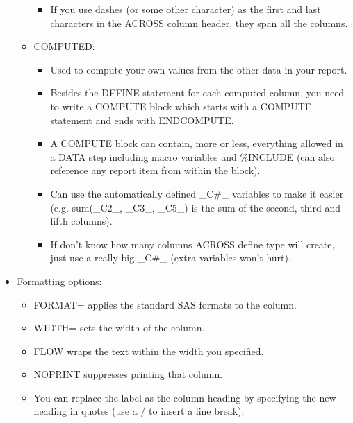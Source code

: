 \documentclass[11pt, oneside]{article}
\begin{document}
\begin{itemize}
\begin{itemize}
\begin{itemize}
		\item If you use dashes (or some other character) as the first and last characters in the ACROSS column header, they span all the columns.
		\end{itemize}
	\item COMPUTED:
		\begin{itemize}
		\item Used to compute your own values from the other data in your report.
		\item Besides the DEFINE statement for each computed column, you need to write a COMPUTE block which starts with a COMPUTE statement and ends with ENDCOMPUTE.
		\item A COMPUTE block can contain, more or less, everything allowed in a DATA step including macro variables and \%INCLUDE (can also reference any report item from within the block). 
		\item Can use the automatically defined \_C\#\_ variables to make it easier (e.g. sum(\_C2\_, \_C3\_, \_C5\_) is the sum of the second, third and fifth columns). 
		\item If don't know how many columns ACROSS define type will create, just use a really big \_C\#\_ (extra variables won't hurt).
		\end{itemize}
	\end{itemize}
\item Formatting options:
	\begin{itemize}
	\item FORMAT= applies the standard SAS formats to the column.
	\item WIDTH= sets the width of the column. 
	\item FLOW wraps the text within the width you specified.
	\item NOPRINT suppresses printing that column.
	\item You can replace the label as the column heading by specifying the new heading in quotes (use a / to insert a line break).
	\end{itemize}
\end{itemize}
\end{document}
